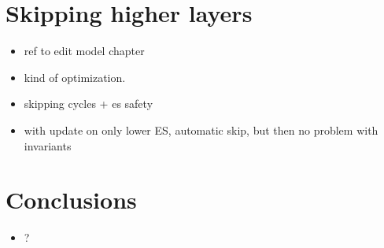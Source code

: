 \section{Skipping higher layers}
\begin{itemize}
\item ref to edit model chapter
\item kind of optimization. 
\item skipping cycles + es safety
\item with update on only lower ES, automatic skip, but then no problem with invariants
\end{itemize}

\section{Conclusions}

\begin{itemize}
\item ?
\end{itemize}




